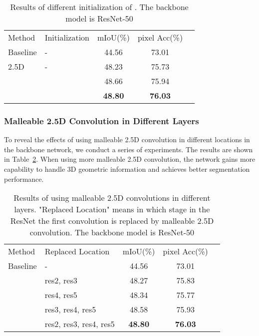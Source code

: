 \documentclass[runningheads]{llncs}
\begin{document}
\begin{table}[htbp]
  \begin{center}
  \caption{
  Results of different initialization of .
  The backbone model is ResNet-50
  }
  \label{table:ablation_initialization}
  \setlength{\tabcolsep}{10pt}
  \begin{tabular}{llccc}
    \hline\noalign{\smallskip}
    Method & Initialization & mIoU(\%) & pixel Acc(\%)\\
    \noalign{\smallskip}
    \hline
    \noalign{\smallskip}
    Baseline      & - & 44.56  & 73.01 \\
    2.5D\cite{2_5D}          & - & 48.23 & 75.73 \\
    \noalign{\smallskip}
    \hline
    \noalign{\smallskip}
    \multirow{2}{*}{Malleable 2.5D} &  & 48.66 & 75.94 \\
     &  & \textbf{48.80} & \textbf{76.03} \\
    \hline
  \end{tabular}
  \end{center}
\end{table}

\subsubsection{Malleable 2.5D Convolution in Different Layers}
To reveal the effects of using malleable 2.5D convolution in different locations in the backbone network, we conduct a series of experiments.
The results are shown in Table~\ref{table:ablation_location}.
When using more malleable 2.5D convolution, the network gains more capability to handle 3D geometric information and achieves better segmentation performance.

\begin{table}[htbp]
  \begin{center}
  \caption{
  Results of using malleable 2.5D convolutions in different layers.
  "Replaced Location" means in which stage in the ResNet the first  convolution is replaced by malleable 2.5D convolution.
  The backbone model is ResNet-50
  }
  \label{table:ablation_location}
  \setlength{\tabcolsep}{10pt}
  \begin{tabular}{llccc}
    \hline\noalign{\smallskip}
    Method & Replaced Location & mIoU(\%) & pixel Acc(\%)\\
    \noalign{\smallskip}
    \hline
    \noalign{\smallskip}
    Baseline      & - & 44.56  & 73.01 \\
    \noalign{\smallskip}
    \hline
    \noalign{\smallskip}
    \multirow{4}{*}{Malleable 2.5D} & res2, res3 & 48.27 & 75.83 \\
     & res4, res5             & 48.34 & 75.77 \\
     & res3, res4, res5       & 48.58 & 75.93 \\
     & res2, res3, res4, res5 & \textbf{48.80} & \textbf{76.03} \\
    \hline
  \end{tabular}
  \end{center}
\end{table}
\end{document}
